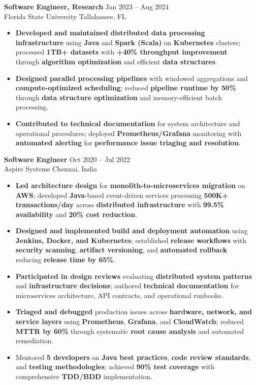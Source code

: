 \documentclass[letterpaper,10pt]{article}
\newcommand{\resumeItem}[1]{\item\small #1}
\newcommand{\resumeSubheading}[4]{
  \vspace{6pt}
  \noindent
  \textbf{#1} \hfill {\footnotesize #2} \\
  [-1pt]
  \noindent
  \small #3 \hfill {\small #4}
  \vspace{3pt}
}
\newcommand{\resumeItemsStart}{\vspace{-2pt}\begin{itemize}}
\newcommand{\resumeItemsEnd}{\end{itemize}\vspace{6pt}}
\begin{document}
\resumeSubheading
{Software Engineer, Research}{Jan 2023 -- Aug 2024}
{Florida State University}{Tallahassee, FL}
\resumeItemsStart
\resumeItem{\textbf{Developed and maintained} \textbf{distributed data processing infrastructure} using \textbf{Java} and \textbf{Spark (Scala)} on \textbf{Kubernetes} clusters; processed \textbf{1TB+ datasets} with \textbf{+40\% throughput improvement} through \textbf{algorithm optimization} and efficient \textbf{data structures}.}
\resumeItem{\textbf{Designed parallel processing pipelines} with windowed aggregations and \textbf{compute-optimized scheduling}; reduced \textbf{pipeline runtime by 50\%} through \textbf{data structure optimization} and memory-efficient batch processing.}
\resumeItem{\textbf{Contributed to technical documentation} for system architecture and operational procedures; deployed \textbf{Prometheus/Grafana} monitoring with \textbf{automated alerting} for \textbf{performance issue triaging and resolution}.}
\resumeItemsEnd
\vspace{-12pt}

\resumeSubheading
{Software Engineer}{Oct 2020 -- Jul 2022}
{Aspire Systems}{Chennai, India}
\resumeItemsStart
\resumeItem{\textbf{Led architecture design} for \textbf{monolith-to-microservices migration} on \textbf{AWS}; developed \textbf{Java}-based event-driven services processing \textbf{500K+ transactions/day} across \textbf{distributed infrastructure} with \textbf{99.5\% availability} and \textbf{20\% cost reduction}.}
\resumeItem{\textbf{Designed and implemented} \textbf{build and deployment automation} using \textbf{Jenkins, Docker, and Kubernetes}; established \textbf{release workflows} with \textbf{security scanning}, \textbf{artifact versioning}, and \textbf{automated rollback} reducing \textbf{release time by 65\%}.}
\resumeItem{\textbf{Participated in design reviews} evaluating \textbf{distributed system patterns} and \textbf{infrastructure decisions}; authored \textbf{technical documentation} for microservices architecture, API contracts, and operational runbooks.}
\resumeItem{\textbf{Triaged and debugged} production issues across \textbf{hardware, network, and service layers} using \textbf{Prometheus}, \textbf{Grafana}, and \textbf{CloudWatch}; reduced \textbf{MTTR by 60\%} through systematic \textbf{root cause analysis} and automated remediation.}
\resumeItem{Mentored \textbf{5 developers} on \textbf{Java best practices}, \textbf{code review standards}, and \textbf{testing methodologies}; achieved \textbf{90\% test coverage} with comprehensive \textbf{TDD/BDD} implementation.}
\resumeItemsEnd
\vspace{-8pt}
\end{document}
